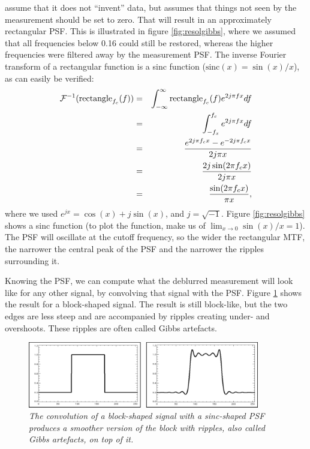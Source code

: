 assume that it does not ``invent'' data, but assumes that things not
seen by the measurement should be set to zero. That will result in an
approximately rectangular PSF. This is illustrated in figure
\ref{fig:resolgibbs}, where we assumed that all frequencies below 0.16
could still be restored, whereas the higher frequencies were filtered
away by the measurement PSF. The inverse Fourier transform of a
rectangular function is a sinc function ($\mbox{sinc}(x) =
\sin(x)/x$), as can easily be verified:
\begin{align}
  {\cal F}^{-1}(\mbox{rectangle}_{f_c}(f))
  &=& \int_{-\infty}^{\infty} \mbox{rectangle}_{f_c}(f) e^{2j\pi f x}
  df \nonumber\\
  &=& \int_{-f_x}^{f_c} e^{2j\pi f x} df \nonumber\\
  &=& \frac{e^{2j\pi f_c x} - e^{- 2j\pi f_c x}}{2j\pi x} \nonumber\\
  &=& \frac{2j \sin(2\pi f_c x)}{2j\pi x} \nonumber\\
  &=& \frac{\sin(2\pi f_c x)}{ \pi x},
\end{align}
where we used $e^{jx} = \cos(x) + j \sin(x)$, and $j =
\sqrt{-1}$. Figure \ref{fig:resolgibbs} shows a sinc function (to plot
the function, make us of $\lim_{x \rightarrow 0} \sin(x)/x = 1$). The PSF
will oscillate at the cutoff frequency, so the wider the rectangular
MTF, the narrower the central peak of the PSF and the narrower the
ripples surrounding it.

Knowing the PSF, we can compute what the deblurred measurement will
look like for any other signal, by convolving that signal with the
PSF. Figure \ref{fig:resolsinc} shows the result for a block-shaped
signal. The result is still block-like, but the two edges are less
steep and are accompanied by ripples creating under- and
overshoots. These ripples are often called Gibbs artefacts.

\begin{figure}[htb]
\centering
\includegraphics[width=0.9\textwidth]{figs/fig_resol_sinc.pdf}
\caption{\label{fig:resolsinc} \emph{The convolution of a block-shaped
    signal with a sinc-shaped PSF produces a smoother version of the
    block with ripples, also called Gibbs artefacts, on top of it.}}
\end{figure}

